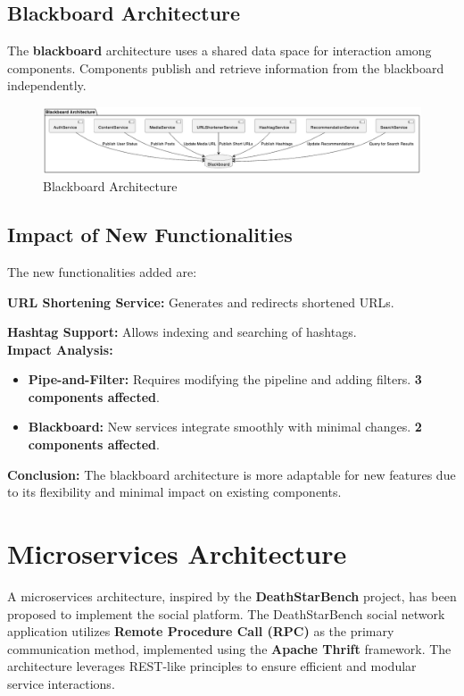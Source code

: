 \documentclass[a4paper,12pt]{article}
\begin{document}
\subsection{Blackboard Architecture}

The \textbf{blackboard} architecture uses a shared data space for interaction among components. Components publish and retrieve information from the blackboard independently.

\begin{figure}[H]
    \centering
    \includegraphics[width=1\linewidth]{blackboard_activity.png}
    \caption{Blackboard Architecture}
    \label{fig:blackboard}
\end{figure}

\subsection{Impact of New Functionalities}

The new functionalities added are:

\textbf{URL Shortening Service:} Generates and redirects shortened URLs.

\textbf{Hashtag Support:} Allows indexing and searching of hashtags. \\

\textbf{Impact Analysis:}
\begin{itemize}
    \item \textbf{Pipe-and-Filter:} Requires modifying the pipeline and adding filters. \textbf{3 components affected}.
    \item \textbf{Blackboard:} New services integrate smoothly with minimal changes. \textbf{2 components affected}.
\end{itemize}

\textbf{Conclusion:} The blackboard architecture is more adaptable for new features due to its flexibility and minimal impact on existing components.

\section{Microservices Architecture}

A microservices architecture, inspired by the \textbf{DeathStarBench} project, has been proposed to implement the social platform. The DeathStarBench social network application utilizes \textbf{Remote Procedure Call (RPC)} as the primary communication method, implemented using the \textbf{Apache Thrift} framework. The architecture leverages REST-like principles to ensure efficient and modular service interactions.
\end{document}
